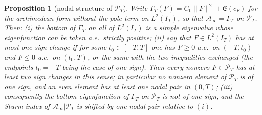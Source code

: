\documentclass[11pt]{amsart}
\newtheorem{proposition}[theorem]{Proposition}
\theoremstyle{definition}
\theoremstyle{remark}
\newcommand{\PT}{\mathcal P_T}
\newcommand{\IT}{I_T}
\newcommand{\cF}{c_F}
\newcommand{\Lev}{\mathfrak E}
\newcommand{\Ainf}{\mathcal A_\infty}
\begin{document}
\begin{proposition}[nodal structure of $\PT$]\label{prop:nodes}
Write $\Gamma_T(F)=C_0\|F\|^2+\Lev(\cF)$ for the archimedean form without the pole term on
$L^2(\IT)$, so that $\Ainf=\Gamma_T$ on $\PT$. Then:
\emph{(i)} the bottom of $\Gamma_T$ on all of $L^2(\IT)$ is a simple eigenvalue whose
eigenfunction can be taken a.e.\ strictly positive;
\emph{(ii)} say that $F\in L^2(\IT)$ has \emph{at most one sign change} if for some
$t_0\in[-T,T]$ one has $F\ge0$ a.e.\ on $(-T,t_0)$ and $F\le0$ a.e.\ on $(t_0,T)$, or the same
with the two inequalities exchanged (the endpoints $t_0=\pm T$ being the case of one sign).
Then every nonzero $F\in\PT$ has at least two sign changes in this sense; in particular no
nonzero element of $\PT$ is of one sign, and an even element has at least one nodal pair in
$(0,T)$;
\emph{(iii)} consequently the bottom eigenfunction of $\Gamma_T$ on $\PT$ is not of one sign,
and the Sturm index of $\Ainf|\PT$ is shifted by one nodal pair relative to $(i)$.
\end{proposition}
\end{document}
